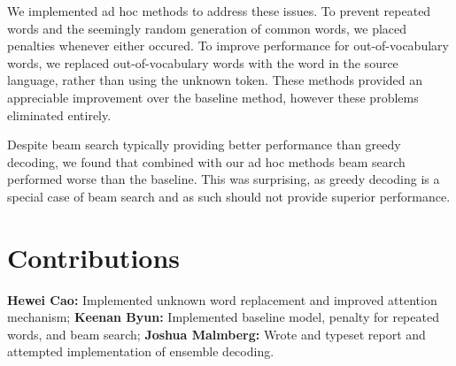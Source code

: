 \documentclass[letter]{article}
\numberwithin{equation}{section}
\newcommand{\0}{\mathbf{0}}
\begin{document}
	We implemented ad hoc methods to address these issues. To prevent repeated words and the seemingly random generation of common words, we placed penalties whenever either occured. To improve performance for out-of-vocabulary words, we replaced out-of-vocabulary words with the word in the source language, rather than using the unknown token. These methods provided an appreciable improvement over the baseline method, however these problems eliminated entirely. 
	
	Despite beam search typically providing better performance than greedy decoding, we found that combined with our ad hoc methods beam search performed worse than the baseline. This was surprising, as greedy decoding is a special case of beam search and as such should not provide superior performance. 
\section{Contributions}

\textbf{Hewei Cao:} Implemented unknown word replacement and improved attention mechanism; \textbf{Keenan Byun:} Implemented baseline model, penalty for repeated words, and beam search; \textbf{Joshua Malmberg:} Wrote and typeset report and attempted implementation of ensemble decoding.
\end{document}
